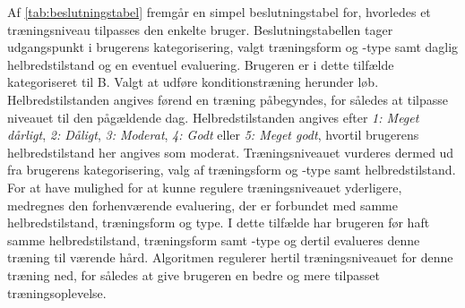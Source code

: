 \noindent
Af \autoref{tab:beslutningstabel} fremgår en simpel beslutningstabel for, hvorledes et træningsniveau tilpasses den enkelte bruger. Beslutningstabellen tager udgangspunkt i brugerens kategorisering, valgt træningsform og -type samt daglig helbredstilstand og en eventuel evaluering. Brugeren er i dette tilfælde kategoriseret til B. Valgt at udføre konditionstræning herunder løb. Helbredstilstanden angives førend en træning påbegyndes, for således at tilpasse niveauet til den pågældende dag. Helbredstilstanden angives efter \textit{1: Meget dårligt}, \textit{2: Dåligt}, \textit{3: Moderat}, \textit{4: Godt} eller \textit{5: Meget godt}, hvortil brugerens helbredstilstand her angives som moderat.
Træningsniveauet vurderes dermed ud fra brugerens kategorisering, valg af træningsform og -type samt helbredstilstand. 
For at have mulighed for at kunne regulere træningsniveauet yderligere, medregnes den forhenværende evaluering, der er forbundet med samme helbredstilstand, træningsform og type. I dette tilfælde har brugeren før haft samme helbredstilstand, træningsform samt -type og dertil evalueres denne træning til værende hård. Algoritmen regulerer hertil træningsniveauet for denne træning ned, for således at give brugeren en bedre og mere tilpasset træningsoplevelse. 
